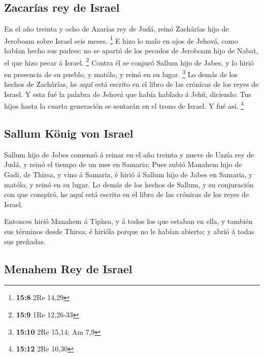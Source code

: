 \hypertarget{zacaruxedas-rey-de-israel}{%
\subsection{Zacarías rey de Israel}\label{zacaruxedas-rey-de-israel}}

 En el año treinta y ocho de Azarías rey de Judá, reinó
Zachârías hijo de Jeroboam sobre Israel seis meses. \footnote{\textbf{15:8}
  2Re 14,29}  E hizo lo malo en ojos de Jehová, como habían
hecho sus padres: no se apartó de los pecados de Jeroboam hijo de Nabat,
el que hizo pecar á Israel. \footnote{\textbf{15:9} 1Re 12,26-33}
 Contra él se conjuró Sallum hijo de Jabes, y lo hirió en
presencia de su pueblo, y matólo, y reinó en su lugar. \footnote{\textbf{15:10}
  2Re 15,14; Am 7,9}  Lo demás de los hechos de Zachârías,
he aquí está escrito en el libro de las crónicas de los reyes de Israel.
 Y esta fué la palabra de Jehová que había hablado á Jehú,
diciendo: Tus hijos hasta la cuarta generación se sentarán en el trono
de Israel. Y fué así. \footnote{\textbf{15:12} 2Re 10,30}

\hypertarget{sallum-kuxf6nig-von-israel}{%
\subsection{Sallum König von Israel}\label{sallum-kuxf6nig-von-israel}}

 Sallum hijo de Jabes comenzó á reinar en el año treinta y
nueve de Uzzía rey de Judá, y reinó el tiempo de un mes en Samaria;
 Pues subió Manahem hijo de Gadi, de Thirsa, y vino á
Samaria, é hirió á Sallum hijo de Jabes en Samaria, y matólo, y reinó en
su lugar.  Lo demás de los hechos de Sallum, y su
conjuración con que conspiró, he aquí está escrito en el libro de las
crónicas de los reyes de Israel.

 Entonces hirió Manahem á Tiphsa, y á todos los que estaban
en ella, y también sus términos desde Thirsa; é hirióla porque no le
habían abierto; y abrió á todas sus preñadas.

\hypertarget{menahem-rey-de-israel}{%
\subsection{Menahem Rey de Israel}\label{menahem-rey-de-israel}}

